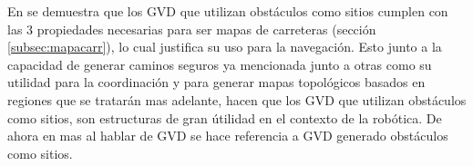 En \cite{choset2005principles} se demuestra que los GVD que utilizan obstáculos como sitios cumplen con las 3 propiedades necesarias para ser mapas de carreteras (sección \ref{subsec:mapacarr}), lo cual justifica su uso para la navegación. Esto junto a la capacidad de generar caminos seguros ya mencionada junto a otras como su utilidad para la coordinación y para generar mapas topológicos basados en regiones que se tratarán mas adelante, hacen que los GVD que utilizan obstáculos como sitios, son estructuras de gran útilidad en el contexto de la robótica. De ahora en mas al hablar de GVD se hace referencia a GVD generado obstáculos como sitios.






